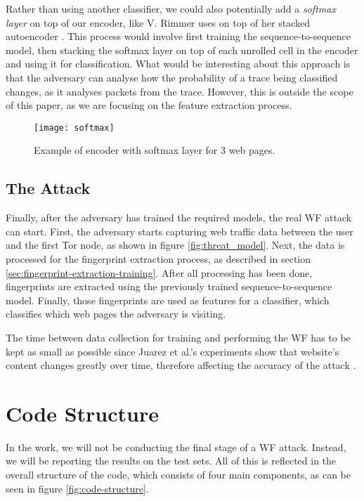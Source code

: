 Rather than using another classifier, we could also potentially add a \textit{softmax layer} on top of our encoder, like V. Rimmer uses on top of her stacked autoencoder \cite{deeplearningthesis}.
This process would involve first training the sequence-to-sequence model, then stacking the softmax layer on top of each unrolled cell in the encoder and using it for classification.
What would be interesting about this approach is that the adversary can analyse how the probability of a trace being classified changes, as it analyses packets from the trace.
However, this is outside the scope of this paper, as we are focusing on the feature extraction process.

\begin{figure}[ht]
  \centering
  \texttt{[image: softmax]}
  \caption{Example of encoder with softmax layer for 3 web pages.}
  \label{fig:softmax}
\end{figure}

\newpage

\subsection{The Attack}

Finally, after the adversary has trained the required models, the real WF attack can start.
First, the adversary starts capturing web traffic data between the user and the first Tor node, as shown in figure \ref{fig:threat_model}.
Next, the data is processed for the fingerprint extraction process, as described in section \ref{sec:fingerprint-extraction-training}.
After all processing has been done, fingerprints are extracted using the previously trained sequence-to-sequence model.
Finally, those fingerprints are used as features for a classifier, which classifies which web pages the adversary is visiting.

The time between data collection for training and performing the WF has to be kept as small as possible since Juarez et al.'s experiments show that website's content changes greatly over time, therefore affecting the accuracy of the attack \cite{wfpevaluation}.

\section{Code Structure}

In the work, we will not be conducting the final stage of a WF attack.
Instead, we will be reporting the results on the test sets.
All of this is reflected in the overall structure of the code, which consists of four main components, as can be seen in figure \ref{fig:code-structure}.

